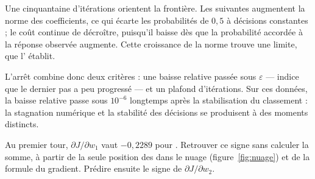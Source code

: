\begin{resultat}
Une cinquantaine d'itérations orientent la frontière. Les suivantes augmentent la
norme des coefficients, ce qui écarte les probabilités de $0{,}5$ à décisions
constantes ; le coût continue de décroître, puisqu'il baisse dès que la
probabilité accordée à la réponse observée augmente. Cette croissance de la norme
trouve une limite, que l' établit.

L'arrêt combine donc deux critères : une baisse relative passée sous
$\varepsilon$ --- indice que le dernier pas a peu progressé --- et un plafond
d'itérations. Sur ces données, la baisse relative passe sous $10^{-6}$ longtemps
après la stabilisation du classement : la stagnation numérique et la stabilité
des décisions se produisent à des moments distincts.
\end{resultat}

\begin{exercice}
Au premier tour, $\partial J/\partial w_1$ vaut $-0{,}2289$ pour \Herb. Retrouver
ce signe sans calculer la somme, à partir de la seule position des \Gryf dans le
nuage (figure~\ref{fig:nuage}) et de la formule du gradient. Prédire ensuite le
signe de $\partial J/\partial w_2$.
\end{exercice}
